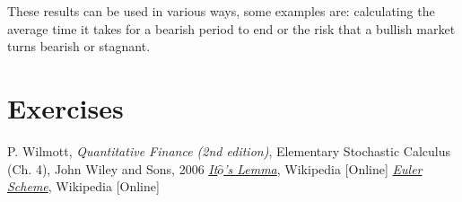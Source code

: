 These results can be used in various ways, some examples are: calculating the average time it takes for a bearish period to end or the risk that a bullish market turns bearish or stagnant.

\section*{Exercises}


\begin{thebibliography}{9}
 P. Wilmott, \emph{Quantitative Finance (2nd edition)}, Elementary Stochastic Calculus (Ch. 4), John Wiley and Sons, 2006 
\href{https://en.wikipedia.org/wiki/It\%C3\%B4\%27s_lemma}{\emph{It$\hat{o}$'s Lemma}}, Wikipedia [Online]
 \href{https://en.wikipedia.org/wiki/Euler_method}{\emph{Euler Scheme}}, Wikipedia [Online]
\end{thebibliography}









